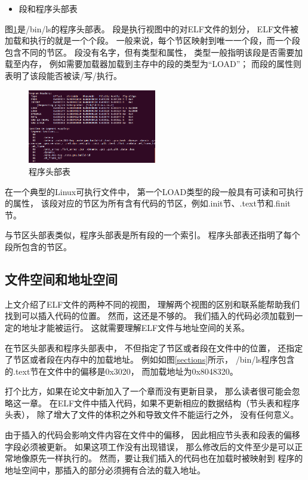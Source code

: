 \begin{itemize}
  \item 段和程序头部表
\end{itemize}

图\ref{programs}是/bin/ls的程序头部表。
段是执行视图中的对ELF文件的划分，
ELF文件被加载和执行的就是一个个段。
一般来说，每个节区映射到唯一一个段，而一个段包含不同的节区。
段没有名字，但有类型和属性，
类型一般指明该段是否需要加载至内存，
例如需要加载器加载到主存中的段的类型为“LOAD”；
而段的属性则表明了该段能否被读/写/执行。

\begin{figure}[h!]
  \centering
  \includegraphics[width=0.5\textwidth]{figure/programs.png}
  \caption{程序头部表}
  \label{programs}
\end{figure}
在一个典型的Linux可执行文件中，
第一个LOAD类型的段一般具有可读和可执行的属性，
该段对应的节区为所有含有代码的节区，例如.init节、.text节和.finit节。

与节区头部表类似，程序头部表是所有段的一个索引。
程序头部表还指明了每个段所包含的节区。


\subsection{文件空间和地址空间}

上文介绍了ELF文件的两种不同的视图，
理解两个视图的区别和联系能帮助我们找到可以插入代码的位置。
然而，这还是不够的。
我们插入的代码必须加载到一定的地址才能被运行。
这就需要理解ELF文件与地址空间的关系。

在节区头部表和程序头部表中，
不但指定了节区或者段在文件中的位置，
还指定了节区或者段在内存中的加载地址。
例如如图\ref{sections}所示，
/bin/ls程序包含的.text节在文件中的偏移是0x3020，
而加载地址为0x8048320。

打个比方，如果在论文中新加入了一个章而没有更新目录，
那么读者很可能会忽略这一章。
在ELF文件中插入代码，如果不更新相应的数据结构（节头表和程序头表），
除了增大了文件的体积之外和导致文件不能运行之外，
没有任何意义。

由于插入的代码会影响文件内容在文件中的偏移，
因此相应节头表和段表的偏移字段必须被更新。
如果这项工作没有出现错误，
那么修改后的文件至少是可以正常地像原先一样执行的。
然而，要让我们插入的代码也在加载时被映射到
程序的地址空间中，那插入的部分必须拥有合法的载入地址。


